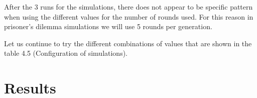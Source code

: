 \documentclass{article}
\begin{document}
After the 3 runs for the simulations, there does not appear to be specific pattern when using the different values for the number of rounds used. For this reason in prisoner's dilemma simulations we will use 5 rounds per generation.

Let us continue to try the different combinations of values that are shown in the table 4.5 (Configuration of simulations). 




\section{Results}

\newpage


\end{document}
